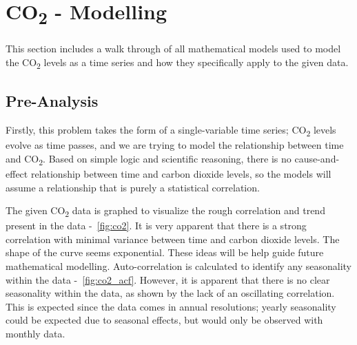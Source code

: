 \documentclass{mcmthesis}
\begin{document}
    \section{CO\textsubscript{2} - Modelling}
    This section includes a walk through of all mathematical models used to model the CO\textsubscript{2} levels as a time series and how they specifically apply to the given data.

    \subsection{Pre-Analysis}
    Firstly, this problem takes the form of a single-variable time series; CO\textsubscript{2} levels evolve as time passes, and we are trying to model the relationship between time and CO\textsubscript{2}.
    Based on simple logic and scientific reasoning, there is no cause-and-effect relationship between time and carbon dioxide levels, so the models will assume a relationship that is purely a statistical correlation.

    The given CO\textsubscript{2} data is graphed to visualize the rough correlation and trend present in the data -~\ref{fig:co2}. It is very apparent that there is a strong correlation with minimal variance between time and carbon dioxide levels. The shape of the curve seems exponential. These ideas will be help guide future mathematical modelling.
    Auto-correlation is calculated to identify any seasonality within the data -~\ref{fig:co2_acf}. However, it is apparent that there is no clear seasonality within the data, as shown by the lack of an oscillating correlation. This is expected since the data comes in annual resolutions; yearly seasonality could be expected due to seasonal effects, but would only be observed with monthly data.
\end{document}
